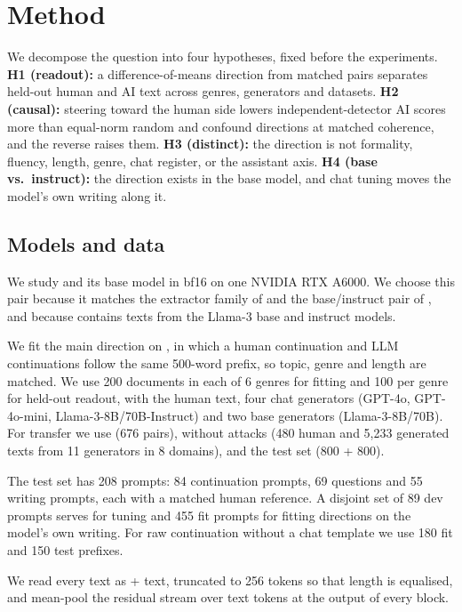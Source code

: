 \section{Method}
\label{sec:method}

We decompose the question into four hypotheses, fixed before the experiments.
{\bf H1 (readout):} a difference-of-means direction from matched pairs separates held-out human and AI text across genres, generators and datasets.
{\bf H2 (causal):} steering toward the human side lowers independent-detector AI scores more than equal-norm random and confound directions at matched coherence, and the reverse raises them.
{\bf H3 (distinct):} the direction is not formality, fluency, length, genre, chat register, or the assistant axis.
{\bf H4 (base vs.\ instruct):} the direction exists in the base model, and chat tuning moves the model's own writing along it.

\subsection{Models and data}

We study \llamai and its base model \llamab in bf16 on one NVIDIA RTX A6000.
We choose this pair because it matches the extractor family of \citet{quaremba2026linear} and the base/instruct pair of \citet{xu2026base}, and because \hape contains texts from the Llama-3 base and instruct models.

We fit the main direction on \hape \citep{reinhart2024hape}, in which a human continuation and LLM continuations follow the same 500-word prefix, so topic, genre and length are matched.
We use 200 documents in each of 6 genres for fitting and 100 per genre for held-out readout, with the human text, four chat generators (GPT-4o, GPT-4o-mini, Llama-3-8B/70B-Instruct) and two base generators (Llama-3-8B/70B).
For transfer we use \hcthree (676 pairs), \raid without attacks (480 human and 5{,}233 generated texts from 11 generators in 8 domains), and the \mage test set (800 + 800).

The test set has 208 prompts: 84 \hape continuation prompts, 69 \hcthree questions and 55 \raid writing prompts, each with a matched human reference.
A disjoint set of 89 dev prompts serves for tuning and 455 fit prompts for fitting directions on the model's own writing.
For raw continuation without a chat template we use 180 fit and 150 test \hape prefixes.

We read every text as \bos + text, truncated to 256 tokens so that length is equalised, and mean-pool the residual stream over text tokens at the output of every block.

